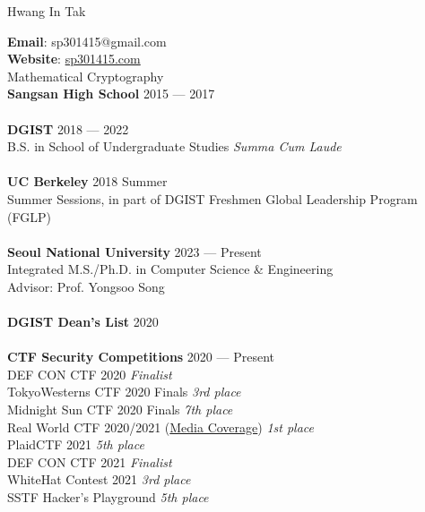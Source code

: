 


{\Huge Hwang In Tak} \hfill

\vspace{0.5cm}

\textbf{Email}: sp301415@gmail.com \\
\textbf{Website}: \href{https://sp301415.com}{sp301415.com} \\

Mathematical Cryptography \\

\textbf{Sangsan High School} \hfill 2015 --- 2017 \\
\\
\textbf{DGIST} \hfill 2018 --- 2022 \\
B.S. in School of Undergraduate Studies \hfill \textit{Summa Cum Laude} \\
\\
\textbf{UC Berkeley} \hfill 2018 Summer \\
Summer Sessions, in part of DGIST Freshmen Global Leadership Program (FGLP) \\
\\
\textbf{Seoul National University} \hfill 2023 --- Present \\
Integrated M.S./Ph.D. in Computer Science \& Engineering \\
Advisor: Prof. Yongsoo Song \\
\\

\textbf{DGIST Dean's List} \hfill 2020 \\
\\
\textbf {CTF Security Competitions} \hfill 2020 --- Present \\
DEF CON CTF 2020 \hfill \textit{Finalist} \\
TokyoWesterns CTF 2020 Finals \hfill \textit{3rd place} \\
Midnight Sun CTF 2020 Finals \hfill \textit{7th place} \\
Real World CTF 2020/2021 (\href{https://www.boannews.com/media/view.asp?idx=94063}{Media Coverage})  \hfill \textit{1st place} \\
PlaidCTF 2021 \hfill \textit{5th place} \\
DEF CON CTF 2021 \hfill \textit{Finalist} \\
WhiteHat Contest 2021 \hfill \textit{3rd place} \\
SSTF Hacker's Playground \hfill \textit{5th place} \\


